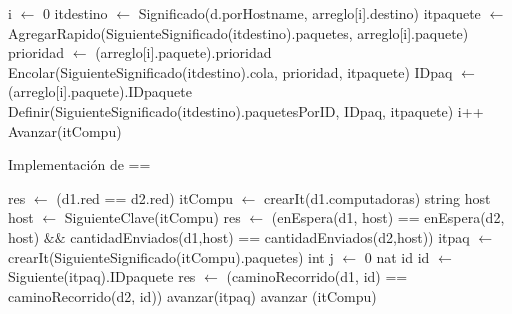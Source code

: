 \begin{Algoritmos}
\begin{algorithm}
\begin{algorithmic}[0]
	\State {}
	\State i $\gets$ 0
	 	
			\State itdestino $\gets$ Significado(d.porHostname, arreglo[i].destino) 
			\State itpaquete $\gets$ AgregarRapido(SiguienteSignificado(itdestino).paquetes, arreglo[i].paquete) 
			\State {}
			\State prioridad $\gets$ (arreglo[i].paquete).prioridad
			\State Encolar(SiguienteSignificado(itdestino).cola, prioridad, itpaquete) 
			\State IDpaq $\gets$ (arreglo[i].paquete).IDpaquete 		
			\State Definir(SiguienteSignificado(itdestino).paquetesPorID, IDpaq, itpaquete) 
		\EndIf
	\State i++
	\State Avanzar(itCompu)
	\EndWhile
	
\EndFunction
\end{algorithmic}
\end{algorithm}

\begin{algorithm}
\caption{Implementaci\'on de ==}
\begin{algorithmic}[0]
	\State res $\gets$ (d1.red == d2.red)						
	 													
		\State itCompu $\gets$ crearIt(d1.computadoras)  		
		\State string host 										
			
			\State host $\gets$ SiguienteClave(itCompu)			 
			\State res $\gets$ (enEspera(d1, host) == enEspera(d2, host) $\&\&$ \newline  cantidadEnviados(d1,host) == cantidadEnviados(d2,host))  
			\State itpaq $\gets$ crearIt(SiguienteSignificado(itCompu).paquetes) 
			\State int j $\gets$ 0												
			\State nat id														
				
				\State id $\gets$ Siguiente(itpaq).IDpaquete 					
				\State res $\gets$ (caminoRecorrido(d1, id) == caminoRecorrido(d2, id)) 
				\State avanzar(itpaq)											
			\EndWhile
		\State avanzar (itCompu)													
		\EndWhile
	\EndIf
\EndFunction
\end{algorithmic}
\end{algorithm}

\end{Algoritmos}

\clearpage


